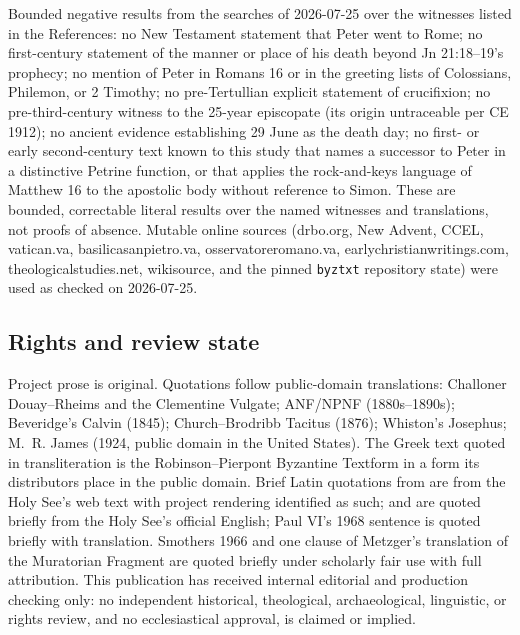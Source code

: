 Bounded negative results from the searches of 2026-07-25 over the witnesses
listed in the References: no New Testament statement that Peter went to Rome;
no first-century statement of the manner or place of his death beyond
Jn 21:18--19's prophecy; no mention of Peter in Romans 16 or in the greeting
lists of Colossians, Philemon, or 2 Timothy; no pre-Tertullian explicit
statement of crucifixion; no pre-third-century witness to the 25-year
episcopate (its origin untraceable per CE 1912); no ancient evidence
establishing 29 June as the death day; no first- or early second-century text
known to this study that names a successor to Peter in a distinctive Petrine
function, or that applies the rock-and-keys language of Matthew 16 to the
apostolic body without reference to Simon. These are bounded, correctable
literal results over the named witnesses and translations, not proofs of
absence. Mutable online sources (drbo.org, New Advent, CCEL, vatican.va,
basilicasanpietro.va, osservatoreromano.va, earlychristianwritings.com,
theologicalstudies.net, wikisource, and the pinned \texttt{byztxt} repository
state) were used as checked on 2026-07-25.

\subsection{Rights and review state}

Project prose is original. Quotations follow public-domain translations:
Challoner Douay--Rheims and the Clementine Vulgate; ANF/NPNF
(1880s--1890s); Beveridge's Calvin (1845); Church--Brodribb Tacitus (1876);
Whiston's Josephus; M.~R. James (1924, public domain in the United States).
The Greek text quoted in transliteration is the Robinson--Pierpont Byzantine
Textform in a form its distributors place in the public domain. Brief Latin
quotations from  are from the Holy See's web text with
project rendering identified as such;  and  are quoted briefly from the Holy See's official English; Paul VI's 1968
sentence is quoted briefly with translation. Smothers 1966 and one clause of
Metzger's translation of the Muratorian Fragment are quoted briefly under
scholarly fair use with full attribution. This publication has received
internal editorial and production checking only: no independent historical,
theological, archaeological, linguistic, or rights review, and no
ecclesiastical approval, is claimed or implied.
